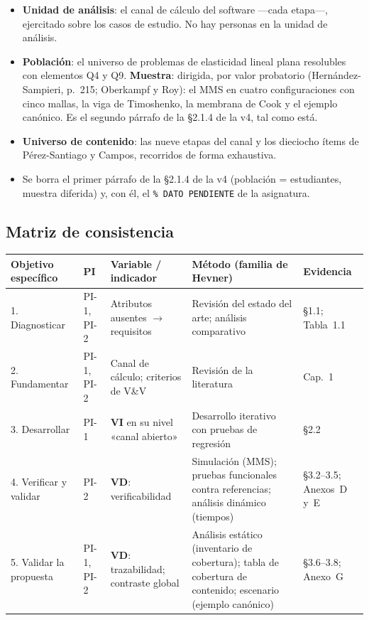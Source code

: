 \documentclass[11pt,a4paper]{article}
\newcommand{\vi}{\textbf{VI}}
\newcommand{\vd}{\textbf{VD}}
\begin{document}
\begin{itemize}
\item \textbf{Unidad de análisis}: el canal de cálculo del software —cada etapa—, ejercitado sobre los casos de estudio. No hay personas en la unidad de análisis.
\item \textbf{Población}: el universo de problemas de elasticidad lineal plana resolubles con elementos Q4 y Q9. \textbf{Muestra}: dirigida, por valor probatorio (Hernández-Sampieri, p.~215; Oberkampf y Roy): el MMS en cuatro configuraciones con cinco mallas, la viga de Timoshenko, la membrana de Cook y el ejemplo canónico. Es el segundo párrafo de la §2.1.4 de la v4, tal como está.
\item \textbf{Universo de contenido}: las nueve etapas del canal y los dieciocho ítems de Pérez-Santiago y Campos, recorridos de forma exhaustiva.
\item Se borra el primer párrafo de la §2.1.4 de la v4 (población = estudiantes, muestra diferida) y, con él, el \texttt{\% DATO PENDIENTE} de la asignatura.
\end{itemize}

\subsection{Matriz de consistencia}

{\small
\begin{longtable}{L{3.3cm}L{1.3cm}L{3.3cm}L{4.4cm}L{3.2cm}}
\toprule
\textbf{Objetivo específico} & \textbf{PI} & \textbf{Variable / indicador} & \textbf{Método (familia de Hevner)} & \textbf{Evidencia} \\
\midrule
{}. Diagnosticar & PI-1, PI-2 & Atributos ausentes $\to$ requisitos & Revisión del estado del arte; análisis comparativo & §1.1; Tabla~1.1 \\
2. Fundamentar & PI-1, PI-2 & Canal de cálculo; criterios de V\&V & Revisión de la literatura & Cap.~1 \\
3. Desarrollar & PI-1 & \vi{} en su nivel «canal abierto» & Desarrollo iterativo con pruebas de regresión & §2.2 \\
4. Verificar y validar & PI-2 & \vd: verificabilidad & Simulación (MMS); pruebas funcionales contra referencias; análisis dinámico (tiempos) & §3.2--3.5; Anexos~D y~E \\
5. Validar la propuesta & PI-1, PI-2 & \vd: trazabilidad; contraste global & Análisis estático (inventario de cobertura); tabla de cobertura de contenido; escenario (ejemplo canónico) & §3.6--3.8; Anexo~G \\
\bottomrule
\end{longtable}}
\end{document}
